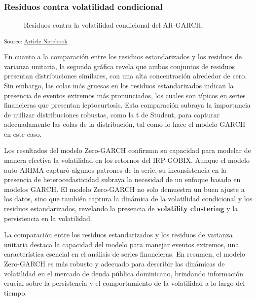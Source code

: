 \documentclass[
  number,
  preprint,
  3p,
  onecolumn]{elsarticle}
\begin{document}
\subsubsection{Residuos contra volatilidad
condicional}\label{residuos-contra-volatilidad-condicional}

\begin{figure}[H]


\caption{\label{fig-residuals-vs-volatility}Residuos contra la
volatilidad condicional del AR-GARCH.}

\end{figure}%

\textsubscript{Source:
\href{https://iancont.github.io/fixed_income_garch/index-preview.html}{Article
Notebook}}

En cuanto a la comparación entre los residuos estandarizados y los
residuos de varianza unitaria, la segunda gráfica revela que ambos
conjuntos de residuos presentan distribuciones similares, con una alta
concentración alrededor de cero. Sin embargo, las colas más gruesas en
los residuos estandarizados indican la presencia de eventos extremos más
pronunciados, los cuales son típicos en series financieras que presentan
leptocurtosis. Esta comparación subraya la importancia de utilizar
distribuciones robustas, como la t de Student, para capturar
adecuadamente las colas de la distribución, tal como lo hace el modelo
GARCH en este caso.

Los resultados del modelo Zero-GARCH confirman su capacidad para modelar
de manera efectiva la volatilidad en los retornos del IRP-GOBIX. Aunque
el modelo auto-ARIMA capturó algunos patrones de la serie, su
inconsistencia en la presencia de heterocedasticidad subraya la
necesidad de un enfoque basado en modelos GARCH. El modelo Zero-GARCH no
solo demuestra un buen ajuste a los datos, sino que también captura la
dinámica de la volatilidad condicional y los residuos estandarizados,
revelando la presencia de \textbf{volatility clustering} y la
persistencia en la volatilidad.

La comparación entre los residuos estandarizados y los residuos de
varianza unitaria destaca la capacidad del modelo para manejar eventos
extremos, una característica esencial en el análisis de series
financieras. En resumen, el modelo Zero-GARCH es más robusto y adecuado
para describir las dinámicas de volatilidad en el mercado de deuda
pública dominicano, brindando información crucial sobre la persistencia
y el comportamiento de la volatilidad a lo largo del tiempo.
\end{document}
